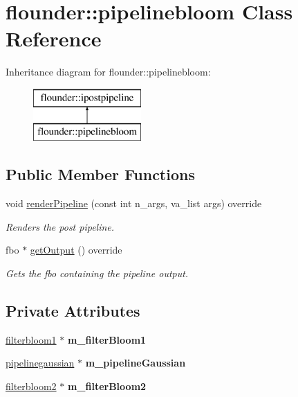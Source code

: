 \hypertarget{classflounder_1_1pipelinebloom}{}\section{flounder\+:\+:pipelinebloom Class Reference}
\label{classflounder_1_1pipelinebloom}
Inheritance diagram for flounder\+:\+:pipelinebloom\+:\begin{figure}[H]
\begin{center}
\leavevmode
\includegraphics[height=2.000000cm]{classflounder_1_1pipelinebloom}
\end{center}
\end{figure}
\subsection*{Public Member Functions}
\begin{DoxyCompactItemize}
\item 
void \hyperlink{classflounder_1_1pipelinebloom_a6ef1ad3bceb0239ed08148cdbce477e2}{render\+Pipeline} (const int n\+\_\+args, va\+\_\+list args) override
\begin{DoxyCompactList}\small\item\em Renders the post pipeline. \end{DoxyCompactList}\item 
fbo $\ast$ \hyperlink{classflounder_1_1pipelinebloom_a0ab1108f9115014014f7a8bd5ca5ac34}{get\+Output} () override
\begin{DoxyCompactList}\small\item\em Gets the fbo containing the pipeline output. \end{DoxyCompactList}\end{DoxyCompactItemize}
\subsection*{Private Attributes}
\begin{DoxyCompactItemize}
\item 
\mbox{\label{classflounder_1_1pipelinebloom_a13ce8b44898b4c33b8dc18ca3ac35ae1}} 
\hyperlink{classflounder_1_1filterbloom1}{filterbloom1} $\ast$ {\bfseries m\+\_\+filter\+Bloom1}
\item 
\mbox{\label{classflounder_1_1pipelinebloom_a46bfd06f745cf4d67f700c52862226ab}} 
\hyperlink{classflounder_1_1pipelinegaussian}{pipelinegaussian} $\ast$ {\bfseries m\+\_\+pipeline\+Gaussian}
\item 
\mbox{\label{classflounder_1_1pipelinebloom_a3e38975362ed7472544d0bff04260337}} 
\hyperlink{classflounder_1_1filterbloom2}{filterbloom2} $\ast$ {\bfseries m\+\_\+filter\+Bloom2}
\end{DoxyCompactItemize}



